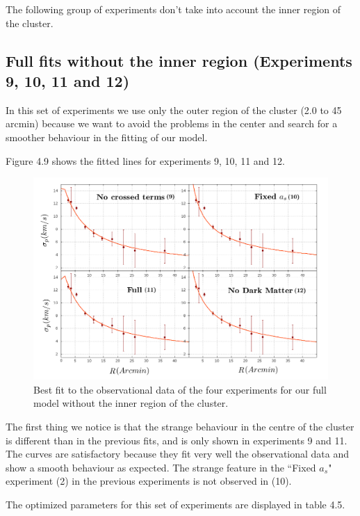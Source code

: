 The following group of experiments don't take into account the inner region of the cluster.

\subsection{Full fits without the inner region (Experiments 9, 10, 11 and 12)}

In this set of experiments we use only the outer region of the cluster (2.0 to 45 arcmin) because we want to avoid the problems in the center and search for a smoother behaviour in the fitting of our model. 

Figure 4.9 shows the fitted lines for experiments 9, 10, 11 and 12.

\begin{figure}[]
\centering
\includegraphics[width=15cm]{images/all_params_refinado_10.png}
\caption[Best fit of the full model without the inner region]{Best fit to the observational data of the four experiments for our full model without the inner region of the cluster.}
\end{figure}

The first thing we notice is that the strange behaviour in the centre of the cluster is different than in the previous fits, and is only shown in experiments 9 and 11. The curves are satisfactory because they fit very well the observational data and show a smooth behaviour as expected. The strange feature in the ``Fixed $a_s$" experiment (2) in the previous experiments is not observed in (10).

The optimized parameters for this set of experiments are displayed in table 4.5.


